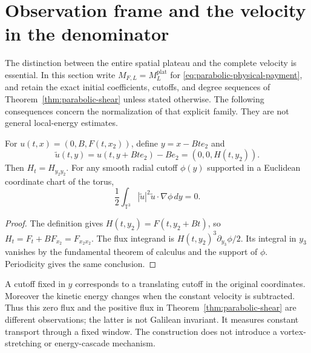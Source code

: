 \section{Observation frame and the velocity in the denominator}
\label{sec:frame-mass}

The distinction between the entire spatial plateau and the complete
velocity is essential.  In this section write
$M_{F,L}=M_L^{\mathrm{plat}}$ for
\eqref{eq:parabolic-physical-payment}, and retain the exact initial
coefficients, cutoffs, and degree sequences of
Theorem~\ref{thm:parabolic-shear} unless stated otherwise.
The following consequences concern the normalization of that explicit
family.  They are not general local-energy estimates.

\begin{proposition}\label{prop:galilean-frame}
For $u(t,x)=(0,B,F(t,x_2))$, define $y=x-Bt e_2$ and
\[
 \widetilde u(t,y)=u(t,y+Bt e_2)-B e_2=(0,0,H(t,y_2)).
\]
Then $H_t=H_{y_2y_2}$.  For any smooth radial cutoff $\phi(y)$
supported in a Euclidean coordinate chart of the torus,
\[
 \frac12\int_{\mathbb T^3}|\widetilde u|^2
                     \widetilde u\cdot\nabla\phi\,dy=0.
\]
\end{proposition}
\begin{proof}
The definition gives $H(t,y_2)=F(t,y_2+Bt)$, so
$H_t=F_t+BF_{x_2}=F_{x_2x_2}$.
The flux integrand is $H(t,y_2)^3\partial_{y_3}\phi/2$.
Its integral in $y_3$ vanishes by the fundamental theorem of calculus
and the support of $\phi$.  Periodicity gives the same conclusion.
\end{proof}

A cutoff fixed in $y$ corresponds to a translating cutoff in the
original coordinates.  Moreover the kinetic energy changes when the
constant velocity is subtracted.  Thus this zero flux and the positive
flux in Theorem~\ref{thm:parabolic-shear} are different observations;
the latter is not Galilean invariant.  It measures constant transport
through a fixed window.  The construction does not introduce a
vortex-stretching or energy-cascade mechanism.

